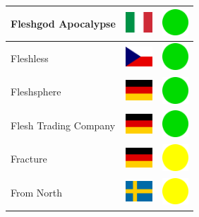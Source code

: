 \documentclass[12pt, a4paper, twoside]{report}
\begin{document}
\begin{center}
\begin{longtable}{|p{5cm}|p{2cm}|p{2cm}|}
 Fleshgod Apocalypse                                        & \includegraphics[width=1cm]{4x3/it} &   \includegraphics[width=1cm]{likes/y} \\ \hline
 Fleshless                                                  & \includegraphics[width=1cm]{4x3/cz} &   \includegraphics[width=1cm]{likes/y} \\ \hline
 Fleshsphere                                                & \includegraphics[width=1cm]{4x3/de} &   \includegraphics[width=1cm]{likes/y} \\ \hline
 Flesh Trading Company                                      & \includegraphics[width=1cm]{4x3/de} &   \includegraphics[width=1cm]{likes/y} \\ \hline
 Fracture                                                   & \includegraphics[width=1cm]{4x3/de} &   \includegraphics[width=1cm]{likes/m} \\ \hline
 From North                                                 & \includegraphics[width=1cm]{4x3/se} &   \includegraphics[width=1cm]{likes/m} \\ \hline

\end{longtable}
\end{center}
\end{document}

